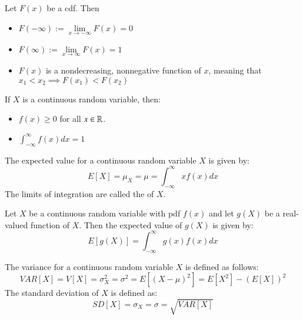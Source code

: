 \documentclass[12pt]{report}
\begin{document}
\begin{props}{}{}
    Let $F(x)$ be a cdf. Then \begin{itemize}
        \item $F(-\infty):= \lim\limits_{x\rightarrow -\infty}F(x) = 0$
        \item $F(\infty) := \lim\limits_{x\rightarrow \infty}F(x) = 1$
        \item $F(x)$ is a nondecreasing, nonnegative function of $x$, meaning that $x_1 < x_2 \implies F(x_1) < F(x_2)$
    \end{itemize}
    If $X$ is a continuous random variable, then: \begin{itemize}
        \item $f(x) \geq 0$ for all $x \in \mathbb R$.
        \item $\int_{-\infty}^{\infty}f(x)dx = 1$
    \end{itemize}
\end{props}


\begin{defn}{}{}
    The expected value for a continuous random variable $X$ is given by: \begin{equation*}
        E[X] = \mu_X = \mu = \int_{-\infty}^{\infty}xf(x)dx
    \end{equation*}
    The limits of integration are called the  of $X$.
\end{defn}

\begin{thm}{}{}
    Let $X$ be a continuous random variable with pdf $f(x)$ and let $g(X)$ be a real-valued function of $X$. Then the expected value of $g(X)$ is given by: \begin{equation*}
        E[g(X)] = \int_{-\infty}^{\infty}g(x)f(x)dx
    \end{equation*}
\end{thm}

\begin{defn}{}{}
    The variance for a continuous random variable $X$ is defined as follows: \begin{equation*}
        VAR[X] = V[X] = \sigma^2_X = \sigma^2 = E[(X-\mu)^2] = E[X^2]-(E[X])^2
    \end{equation*}
    The standard deviation of $X$ is defined as: \begin{equation*}
        SD[X] = \sigma_X = \sigma = \sqrt{VAR[X]}
    \end{equation*}
\end{defn}
\end{document}
